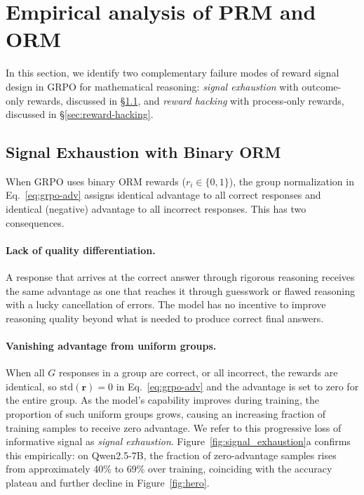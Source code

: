 \section{Empirical analysis of PRM and ORM}
\label{sec:problem}

In this section, we identify two complementary failure modes of reward signal design in GRPO for mathematical reasoning: \emph{signal exhaustion} with outcome-only rewards, discussed in \S\ref{sec:signal-exhaustion}, and \emph{reward hacking} with process-only rewards, discussed in \S\ref{sec:reward-hacking}.

\subsection{Signal Exhaustion with Binary ORM}
\label{sec:signal-exhaustion}

When GRPO uses binary ORM rewards ($r_i \in \{0, 1\}$), the group normalization in Eq.~\ref{eq:grpo-adv} assigns identical advantage to all correct responses and identical (negative) advantage to all incorrect responses. This has two consequences.

\paragraph{Lack of quality differentiation.} A response that arrives at the correct answer through rigorous reasoning receives the same advantage as one that reaches it through guesswork or flawed reasoning with a lucky cancellation of errors. The model has no incentive to improve reasoning quality beyond what is needed to produce correct final answers.

\paragraph{Vanishing advantage from uniform groups.}
  When all $G$ responses in a group are correct, or all incorrect,
  the rewards are identical, so $\mathrm{std}(\mathbf{r}) = 0$
  in Eq.~\ref{eq:grpo-adv} and the advantage is set to zero for
  the entire group. As the model's capability improves during training, the
  proportion of such uniform groups grows, causing an increasing
  fraction of training samples to receive zero advantage. We refer
  to this progressive loss of informative signal as \emph{signal
  exhaustion}. Figure~\ref{fig:signal_exhaustion}a confirms this
  empirically: on Qwen2.5-7B, the fraction of zero-advantage
  samples rises from approximately 40\% to 69\% over training,
  coinciding with the accuracy plateau and further decline in Figure~\ref{fig:hero}.

